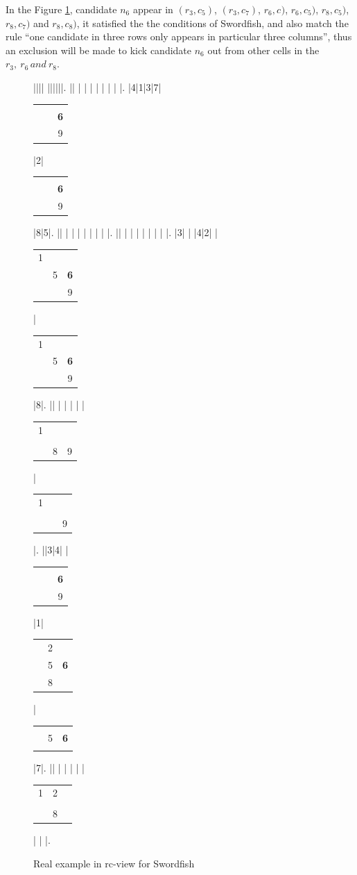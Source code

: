 \documentclass[11pt]{report}
\newcommand{\cell}[9]{%
\scriptsize
\setlength{\tabcolsep}{1pt}
\renewcommand{\arraystretch}{0.5}
\hspace{-0.6em}
\begin{tabular}{ccc}
#1 & #2 & #3\\
#4 & #5 & #6\\
#7 & #8 & #9
\end{tabular}
}
\begin{document}
In the Figure \ref{fig:swordfishrealrc}, candidate $n_{6}$ appear in $(r_{3}, c_{5})$, $(r_{3}, c_{7})$, $r_{6}, c_{})$, $r_{6}, c_{5})$, $r_{8}, c_{5})$, $r_{8}, c_{7})$ and $r_{8}, c_{8})$, it satisfied the the conditions of Swordfish, and also match the rule ``one candidate in three rows only appears in particular three columns'', thus an exclusion will be made to kick candidate $n_{6}$ out from other cells in the  $r_{3},\ r_{6}\, and\ r_{8}$.

\begin{figure}[htbp]
\begin{sudoku}
 |{}|{}|{}| {}|{}|{}|{}|{}|{}|.
 |{}| | | | | | | | |.
 |{4}|1|3|7|{\cell {}{}{}{}{}{\textbf 6}{}{}9}|2|{\cell {}{}{}{}{}{\textbf 6}{}{}9}|8|5|.
 |{}| | | | | | | | |.
 |{}| | | | | | | | |.
 |{3}| | |4|2| |{\cell 1{}{}{}5{\textbf 6}{}{}9}|{\cell 1{}{}{}5{\textbf 6}{}{}9}|8|.
 |{}| | | | | |{\cell 1{}{}{}{}{\xout 6}{}89}| {\cell 1{}{}{}{}{\xout 6}{}{}9} |.
 |{}|3|4| |{\cell {}{}{}{}{}{\textbf 6}{}{}9}|1|{\cell {}2{}{}5{\textbf 6}{}8{}}|{\cell {}{}{}{}5{\textbf 6}{}{}{}}|7|.
 |{}| | | | | |{\cell 12{}{}{}{\xout 6}{}8{}}| | |.
\end{sudoku}
\caption{Real example in rc-view for Swordfish}
\label{fig:swordfishrealrc}
\end{figure}
\end{document}

